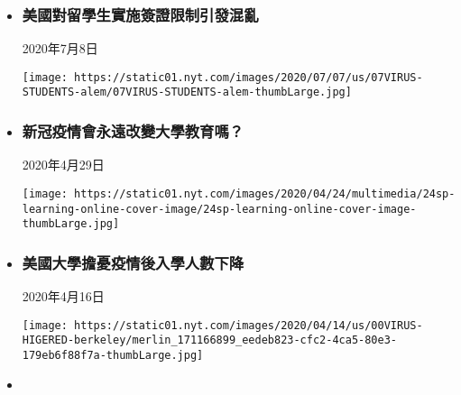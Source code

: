 \begin{itemize}
\item
  \href{/usa/20200708/student-visas-coronavirus/zh-hant/}{}

  \hypertarget{ux7f8eux570bux5c0dux7559ux5b78ux751fux5be6ux65bdux7c3dux8b49ux9650ux5236ux5f15ux767cux6df7ux4e82}{%
  \subsubsection{美國對留學生實施簽證限制引發混亂}\label{ux7f8eux570bux5c0dux7559ux5b78ux751fux5be6ux65bdux7c3dux8b49ux9650ux5236ux5f15ux767cux6df7ux4e82}}

  2020年7月8日

  \texttt{[image: https://static01.nyt.com/images/2020/07/07/us/07VIRUS-STUDENTS-alem/07VIRUS-STUDENTS-alem-thumbLarge.jpg]}
\item
  \href{/education/20200429/coronavirus-online-education-college/zh-hant/}{}

  \hypertarget{ux65b0ux51a0ux75abux60c5ux6703ux6c38ux9060ux6539ux8b8aux5927ux5b78ux6559ux80b2ux55ce}{%
  \subsubsection{新冠疫情會永遠改變大學教育嗎？}\label{ux65b0ux51a0ux75abux60c5ux6703ux6c38ux9060ux6539ux8b8aux5927ux5b78ux6559ux80b2ux55ce}}

  2020年4月29日

  \texttt{[image: https://static01.nyt.com/images/2020/04/24/multimedia/24sp-learning-online-cover-image/24sp-learning-online-cover-image-thumbLarge.jpg]}
\item
  \href{/usa/20200416/coronavirus-colleges-universities-admissions/zh-hant/}{}

  \hypertarget{ux7f8eux570bux5927ux5b78ux64d4ux6182ux75abux60c5ux5f8cux5165ux5b78ux4ebaux6578ux4e0bux964d}{%
  \subsubsection{美國大學擔憂疫情後入學人數下降}\label{ux7f8eux570bux5927ux5b78ux64d4ux6182ux75abux60c5ux5f8cux5165ux5b78ux4ebaux6578ux4e0bux964d}}

  2020年4月16日

  \texttt{[image: https://static01.nyt.com/images/2020/04/14/us/00VIRUS-HIGERED-berkeley/merlin\_171166899\_eedeb823-cfc2-4ca5-80e3-179eb6f88f7a-thumbLarge.jpg]}
\item
  \href{/education/20200313/colleges-cancel-classes-coronavirus/zh-hant/}{}


\end{itemize}
